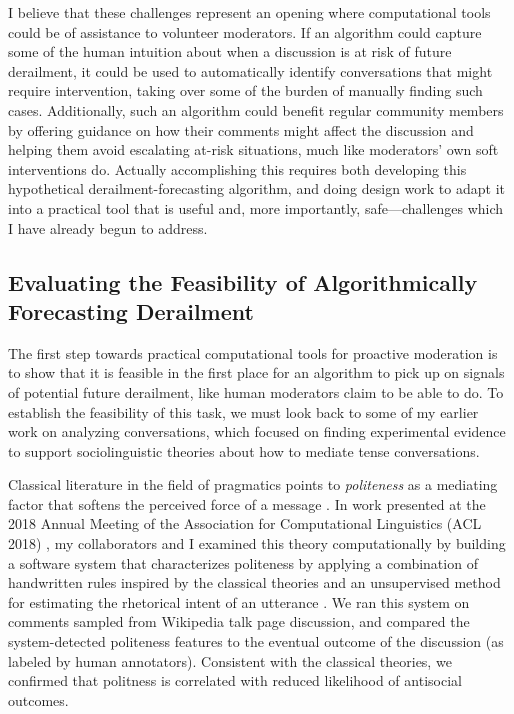 \documentclass[11pt,letterpaper]{article}
\begin{document}
I believe that these challenges represent an opening where computational tools could be of assistance to volunteer moderators.
If an algorithm could capture some of the human intuition about when a discussion is at risk of future derailment, it could be used to automatically identify conversations that might require intervention, taking over some of the burden of manually finding such cases.
Additionally, such an algorithm could benefit regular community members by offering guidance on how their comments might affect the discussion and helping them avoid escalating at-risk situations, much like moderators' own soft interventions do.
Actually accomplishing this requires both developing this hypothetical derailment-forecasting algorithm, and doing design work to adapt it into a practical tool that is useful and, more importantly, safe---challenges which I have already begun to address.

\subsection{Evaluating the Feasibility of Algorithmically Forecasting Derailment}
The first step towards practical computational tools for proactive moderation is to show that it is feasible in the first place for an algorithm to pick up on signals of potential future derailment, like human moderators claim to be able to do.
To establish the feasibility of this task, we must look back to some of my earlier work on analyzing conversations, which focused on finding experimental evidence to support sociolinguistic theories about how to mediate tense conversations.

Classical literature in the field of pragmatics points to \emph{politeness} as a mediating factor that softens the perceived force of a message \cite{brown_politeness:_1987}.
In work presented at the 2018 Annual Meeting of the Association for Computational Linguistics (ACL 2018) \cite{zhang_conversations_2018}, my collaborators and I examined this theory computationally by building a software system that characterizes politeness by applying a combination of handwritten rules inspired by the classical theories \cite{danescu-niculescu-mizil_computational_2013} and an unsupervised method for estimating the rhetorical intent of an utterance \cite{zhang_asking_2017}.
We ran this system on comments sampled from Wikipedia talk page discussion, and compared the system-detected politeness features to the eventual outcome of the discussion (as labeled by human annotators).
Consistent with the classical theories, we confirmed that politness is correlated with reduced likelihood of antisocial outcomes.
\end{document}

